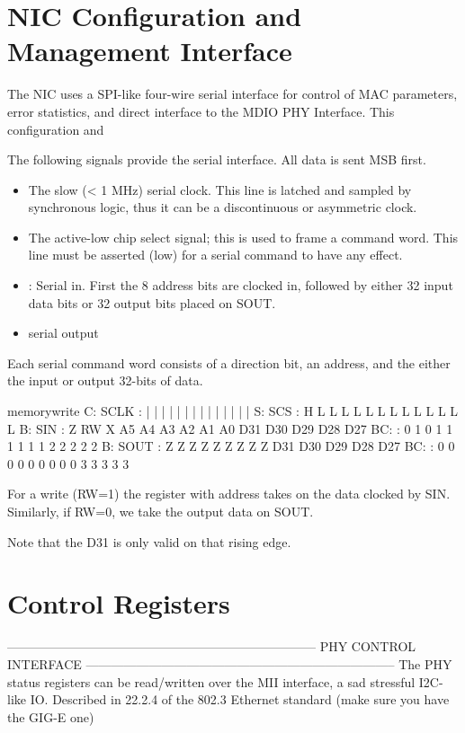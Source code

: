 \section{NIC Configuration and Management Interface}
The NIC uses a SPI-like four-wire serial interface for control of MAC parameters, error statistics, and direct interface to the MDIO PHY Interface. This configuration and 


The following signals provide the serial interface. All data is sent MSB first. 
\begin{itemize}
\item {} The slow (< 1 MHz) serial clock. This line is latched and sampled by synchronous logic, thus it can be a discontinuous or asymmetric clock.
\item {} The active-low chip select signal; this is used to frame a command word. This line must be asserted (low) for a serial command to have any effect. 
\item {} : Serial in. First the 8 address bits are clocked in, followed by either 32 input data bits or 32 output bits placed on SOUT.
\item {} serial output
\end{itemize}

Each serial command word consists of a direction bit, an address, and the either the input or output 32-bits of data. 


\begin{timing}{memorywrite}
C: SCLK    :  |  |  |  |  |  |  |  |  |  |   |   |   |   |  
S: SCS     :  H  L  L  L  L  L  L  L  L  L   L   L   L   L  
B: SIN     :  Z  RW X  A5 A4 A3 A2 A1 A0 D31 D30 D29 D28 D27 
BC:        :  0  1  0  1  1  1  1  1  1  2   2   2   2   2
B: SOUT    :  Z  Z  Z  Z  Z  Z  Z  Z  Z  D31 D30 D29 D28 D27
BC:        :  0  0  0  0  0  0  0  0  0  3   3   3   3   3 
\end{timing}

For a write (RW=1) the register with address  takes on the data clocked by SIN. Similarly, if RW=0, we take the output data on SOUT. 

Note that the D31 is only valid on that rising edge. 

\section{Control Registers}

--------------------------------------------------------------------------
PHY CONTROL INTERFACE
--------------------------------------------------------------------------
The PHY status registers can be read/written over the MII interface, a sad stressful I2C-like IO. Described in 22.2.4 of the 802.3 Ethernet standard (make sure you have the GIG-E one)


